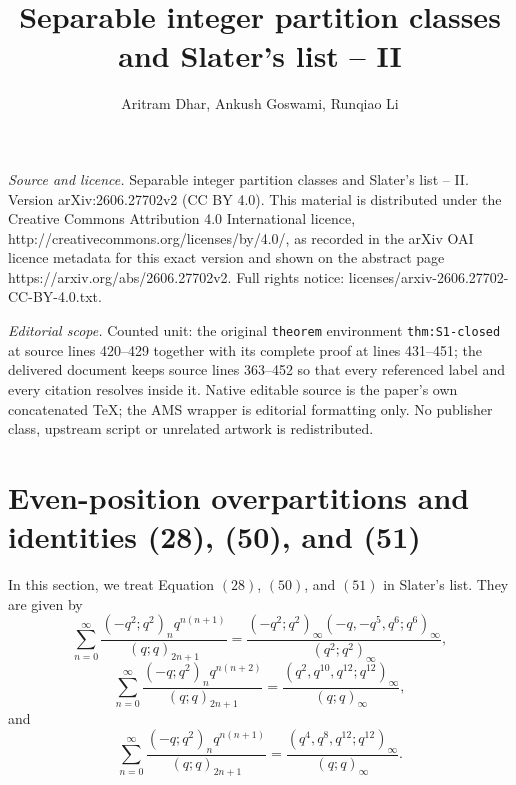 \documentclass[10pt,a4paper]{amsart}
\numberwithin{equation}{section}
\begin{document}
\title[Separable integer partition classes and Slater's list -- II]{Separable integer partition classes and Slater's list -- II}
\author{Aritram Dhar, Ankush Goswami, Runqiao Li}
\date{}
\maketitle
\noindent\emph{Source and licence.} Separable integer partition classes and Slater's list -- II. Version arXiv:2606.27702v2 (CC BY 4.0). This material is distributed under the Creative Commons Attribution 4.0 International licence, http://creativecommons.org/licenses/by/4.0/, as recorded in the arXiv OAI licence metadata for this exact version and shown on the abstract page https://arxiv.org/abs/2606.27702v2. Full rights notice: licenses/arxiv-2606.27702-CC-BY-4.0.txt.\par\smallskip
\noindent\textit{Editorial scope.} Counted unit: the original \texttt{theorem} environment \texttt{thm:S1-closed} at source lines 420--429 together with its complete proof at lines 431--451; the delivered document keeps source lines 363--452 so that every referenced label and every citation resolves inside it. Native editable source is the paper's own concatenated TeX; the AMS wrapper is editorial formatting only. No publisher class, upstream script or unrelated artwork is redistributed.
\section{Even-position overpartitions and identities (28), (50), and (51)}\label{sec:S1}
In this section, we treat Equation $(28)$, $(50)$, and $(51)$ in Slater's list. They are given by
\begin{equation}\label{eq:Slater28}
\sum_{n=0}^{\infty}\frac{(-q^2;q^2)_{n}q^{n(n+1)}}{(q;q)_{2n+1}}
=\dfrac{(-q^2;q^2)_{\infty}(-q,-q^5,q^6;q^6)_{\infty}}{(q^2;q^2)_{\infty}},
\end{equation}
\begin{equation}\label{eq:Slater50}
\sum_{n=0}^{\infty}\frac{(-q;q^2)_nq^{n(n+2)}}{(q;q)_{2n+1}}
=\frac{(q^2,q^{10},q^{12};q^{12})_{\infty}}{(q;q)_{\infty}},
\end{equation}
and
\begin{equation}\label{eq:Slater51}
\sum_{n=0}^{\infty}\frac{(-q;q^2)_nq^{n(n+1)}}{(q;q)_{2n+1}}
=\frac{(q^4,q^8,q^{12};q^{12})_{\infty}}{(q;q)_{\infty}}.
\end{equation}
\end{document}
